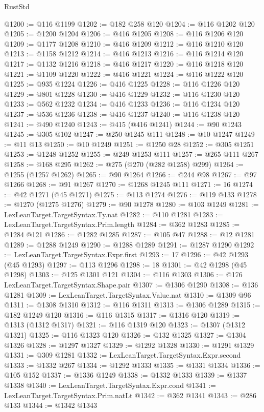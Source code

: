 \begin{lexlean}{RustStd}
\begin{coremodule}
@1200 := @116 @1199
@1202 := @182 @258 @120
@1204 := @116 @1202 @120
@1205 := @1200 @1204
@1206 := @416 @1205
@1208 := @116 @1206 @120
@1209 := @1177 @1208
@1210 := @416 @1209
@1212 := @116 @1210 @120
@1213 := @1158 @1212
@1214 := @416 @1213
@1216 := @116 @1214 @120
@1217 := @1132 @1216
@1218 := @416 @1217
@1220 := @116 @1218 @120
@1221 := @1109 @1220
@1222 := @416 @1221
@1224 := @116 @1222 @120
@1225 := @935 @1224
@1226 := @416 @1225
@1228 := @116 @1226 @120
@1229 := @801 @1228
@1230 := @416 @1229
@1232 := @116 @1230 @120
@1233 := @562 @1232
@1234 := @416 @1233
@1236 := @116 @1234 @120
@1237 := @536 @1236
@1238 := @416 @1237
@1240 := @116 @1238 @120
@1241 := @490 @1240
@1243 := @415 (@416 @1241)
@1244 := @90 @1243
@1245 := @305 @102
@1247 := @250 @1245 @111
@1248 := @10 @1247
@1249 := @11 @13
@1250 := @10 @1249
@1251 := @1250 @28
@1252 := @305 @1251
@1253 := @1248 @1252
@1255 := @249 @1253 @111
@1257 := @265 @111 @267
@1258 := @168 @295
@1262 := @275 (@270 (@282 @1258) @299)
@1264 := @1255 (@1257 @1262)
@1265 := @90 @1264
@1266 := @244 @98
@1267 := @97 @1266
@1268 := @91 @1267
@1270 := @1268 @1245 @111
@1271 := 16
@1274 := @42 @1271 (@45 @1271)
@1275 := @113 @1274
@1276 := @119 @133
@1278 := @1270 (@1275 @1276)
@1279 := @90 @1278
@1280 := @103 @1249
@1281 := LexLeanTarget.TargetSyntax.Ty.nat
@1282 := @110 @1281
@1283 := LexLeanTarget.TargetSyntax.Prim.length
@1284 := @362 @1283
@1285 := @1284 @121
@1286 := @1282 @1285
@1287 := @105 @47
@1288 := @12 @1281
@1289 := @1288 @1249
@1290 := @1288 @1289
@1291 := @1287 @1290
@1292 := LexLeanTarget.TargetSyntax.Expr.first
@1293 := 17
@1296 := @42 @1293 (@45 @1293)
@1297 := @113 @1296
@1298 := 18
@1301 := @42 @1298 (@45 @1298)
@1303 := @125 @1301 @121
@1304 := @116 @1303
@1306 := @176 LexLeanTarget.TargetSyntax.Shape.pair
@1307 := @1306 @1290
@1308 := @136 @1281
@1309 := LexLeanTarget.TargetSyntax.Value.nat
@1310 := @1309 @96
@1311 := @1308 @1310
@1312 := @116 @1311
@1313 := @1306 @1289
@1315 := @182 @1249 @120
@1316 := @116 @1315
@1317 := @1316 @120
@1319 := @1313 (@1312 @1317)
@1321 := @116 @1319 @120
@1323 := @1307 (@1312 @1321)
@1325 := @116 @1323 @120
@1326 := @132 @1325
@1327 := @1304 @1326
@1328 := @1297 @1327
@1329 := @1292 @1328
@1330 := @1291 @1329
@1331 := @309 @1281
@1332 := LexLeanTarget.TargetSyntax.Expr.second
@1333 := @1332 @267
@1334 := @1292 @1333
@1335 := @1331 @1334
@1336 := @105 @152
@1337 := @1336 @1249
@1338 := @1332 @1333
@1339 := @1337 @1338
@1340 := LexLeanTarget.TargetSyntax.Expr.cond
@1341 := LexLeanTarget.TargetSyntax.Prim.natLt
@1342 := @362 @1341
@1343 := @286 @133
@1344 := @1342 @1343

\end{coremodule}
\end{lexlean}
